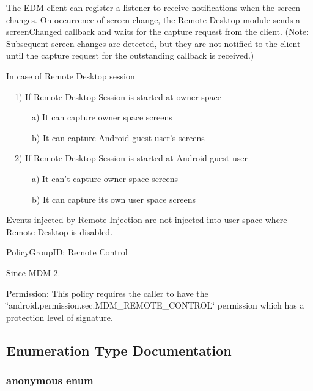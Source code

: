 \-The \-E\-D\-M client can register a listener to receive notifications when the screen changes. \-On occurrence of screen change, the \-Remote \-Desktop module sends a screen\-Changed callback and waits for the capture request from the client. (\-Note\-: \-Subsequent screen changes are detected, but they are not notified to the client until the capture request for the outstanding callback is received.)\par
 \par
 \-In case of \-Remote \-Desktop session\par
 ~~1) \-If \-Remote \-Desktop \-Session is started at owner space\par
 ~~~~~~a) \-It can capture owner space screens\par
 ~~~~~~b) \-It can capture \-Android guest user's screens\par


~~2) \-If \-Remote \-Desktop \-Session is started at \-Android guest user\par
 ~~~~~~a) \-It can't capture owner space screens\par
 ~~~~~~b) \-It can capture its own user space screens\par


\-Events injected by \-Remote \-Injection are not injected into user space where \-Remote \-Desktop is disabled. \par
 \begin{DoxyParagraph}{\-Policy\-Group\-I\-D\-: }
\-Remote \-Control 
\end{DoxyParagraph}
\begin{DoxySince}{\-Since}
\-M\-D\-M 2. 
\end{DoxySince}
\begin{DoxyParagraph}{\-Permission\-: }
\-This policy requires the caller to have the \char`\"{}android.\-permission.\-sec.\-M\-D\-M\-\_\-\-R\-E\-M\-O\-T\-E\-\_\-\-C\-O\-N\-T\-R\-O\-L\char`\"{} permission which has a protection level of signature. 
\end{DoxyParagraph}


\subsection{\-Enumeration \-Type \-Documentation}
\hypertarget{namespaceandroid_a309c85593da4316d1de17e1c4a7ed2a1}{\subsubsection[{anonymous enum}]{\setlength{\rightskip}{0pt plus 5cm}anonymous enum}}\label{namespaceandroid_a309c85593da4316d1de17e1c4a7ed2a1}


